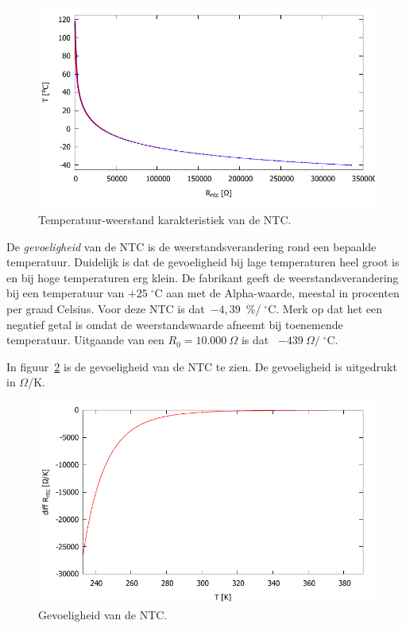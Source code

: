 \documentclass[12pt,a4paper,final,twoside,fleqn]{article}
\newcommand{\mathcelc}[1]{\mbox{$#1\;^\circ\text{C}$}}
\begin{document}
\begin{figure}[ht!]
\centering
\includegraphics[scale=1]{gnuplot/ntc_ntc_plot_celsius_fig_inv}
\caption{Temperatuur-weerstand karakteristiek van de NTC.}
\label{fig:ntc_ntc_plot_celsius_fig_inv}
\end{figure}

De \textsl{gevoeligheid} van de NTC is de weerstandsverandering rond een bepaalde
temperatuur. Duidelijk is dat de gevoeligheid bij lage temperaturen heel groot is
en bij  hoge temperaturen erg klein. De fabrikant geeft de weerstandsverandering
bij een temperatuur van $\mathcelc{+25}$ aan met de Alpha-waarde, meestal in
procenten per graad Celsius. Voor deze NTC is dat~$-4,39$~\%/\mathcelc{\!}. Merk
op dat het een negatief getal is omdat de weerstandswaarde afneemt bij toenemende
temperatuur. Uitgaande van een $R_0 = 10.000\ \Omega$ is dat~%
\mbox{$-439\ \Omega/\mathcelc{\!}$}.

In figuur~\ref{fig:ntc_sensitivity_ntc} is de gevoeligheid van de NTC te zien.
De gevoeligheid is uitgedrukt in $\Omega$/K.

\begin{figure}[ht!]
\centering
\includegraphics[scale=1]{gnuplot/ntc_sensitivity_ntc}
\caption{Gevoeligheid van de NTC.}
\label{fig:ntc_sensitivity_ntc}
\end{figure}
\end{document}
